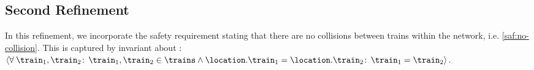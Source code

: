 

\subsection{Second Refinement}
\label{sec:second-refinement}
In this refinement, we incorporate the safety requirement stating that
there are no collisions between trains within the network,
i.e. \ref{saf:no-collision}.  This is captured by invariant
 about \location: $\qforall{\train_1,\train_2}{\train_1, \train_2 \in \trains \land \location.\train_1 =
  \location.\train_2}{\train_1 = \train_2}$.

